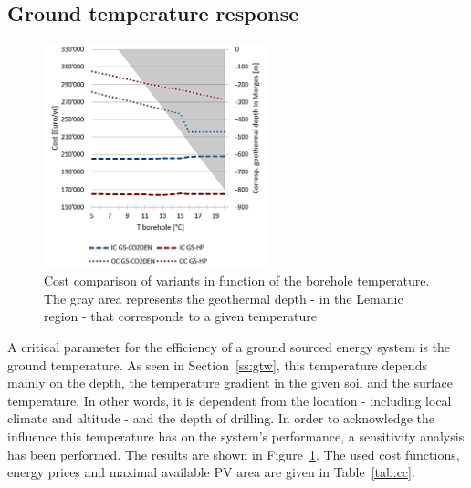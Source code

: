 \documentclass{article}
\begin{document}
\subsection{Ground temperature response}\label{ss:Tg}


\begin{figure} 
	\vspace{-20pt}
	\centering
	\includegraphics[width=0.58\textwidth]{V_SA_Tg.png}
	\caption{Cost comparison of variants in function of the borehole temperature. The gray area represents the geothermal depth - in the Lemanic region - that corresponds to a given temperature}
	\label{fig:V_SA_Tg}
	\vspace{-10pt}
\end{figure}

A critical parameter for the efficiency of a ground sourced energy system is the ground temperature. As seen in Section~\ref{ss:gtw}, this temperature depends mainly on the depth, the temperature gradient in the given soil and the surface temperature. In other words, it is dependent from the location - including local climate and altitude - and the depth of drilling. In order to acknowledge the influence this temperature has on the system's performance, a sensitivity analysis has been performed. The results are shown in Figure~\ref{fig:V_SA_Tg}. The used cost functions, energy prices and maximal available PV area are given in Table~\ref{tab:cc}. \\ 
\end{document}
